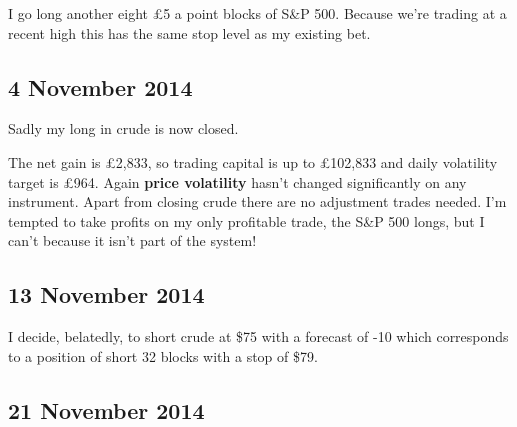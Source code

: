 I go long another eight £5 a point blocks of S\&P 500. Because we're trading at a recent high this has the same stop level as my existing bet.

\subsection*{4 November 2014}

Sadly my long in crude is now closed.


The net gain is £2,833, so trading capital is up to £102,833 and daily volatility target is £964. Again \textbf{price volatility} hasn't changed significantly on any instrument. Apart from closing crude there are no adjustment trades needed. I'm tempted to take profits on my only profitable trade, the S\&P 500 longs, but I can't because it isn't part of the system!

\subsection*{13 November 2014}

I decide, belatedly, to short crude at \$75 with a forecast of -10 which corresponds to a position of short 32 blocks with a stop of \$79.

\subsection*{21 November 2014}

